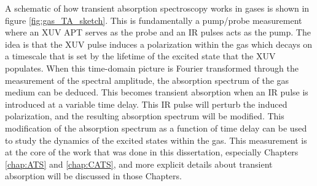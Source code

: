 A schematic of how transient absorption spectroscopy works in gases is shown in figure \ref{fig:gas_TA_sketch}.  This is fundamentally a pump/probe measurement where an XUV APT serves as the probe and an IR pulses acts as the pump.  The idea is that the XUV pulse induces a polarization within the gas which decays on a timescale that is set by the lifetime of the excited state that the XUV populates.  When this time-domain picture is Fourier transformed through the measurement of the spectral amplitude, the absorption spectrum of the gas medium can be deduced.  This becomes transient absorption when an IR pulse is introduced at a variable time delay.  This IR pulse will perturb the induced polarization, and the resulting absorption spectrum will be modified.  This modification of the absorption spectrum as a function of time delay can be used to study the dynamics of the excited states within the gas.  This measurement is at the core of the work that was done in this dissertation, especially Chapters \ref{chap:ATS} and \ref{chap:CATS}, and more explicit details about transient absorption will be discussed in those Chapters.

